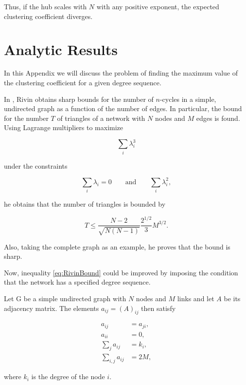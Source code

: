\documentclass{article}
\begin{document}
Thus, if the hub scales with $N$ with any positive exponent, the expected clustering coefficient diverges.

\section{Analytic Results}

In this Appendix we will discuss the problem of finding the maximum value of the clustering coefficient for a given degree sequence.

In \cite{Rivin2002}, Rivin obtains sharp bounds for the number of $n$-cycles in a simple, undirected graph as a function of the number of edges. In particular, the bound for the number $T$ of triangles of a network with $N$ nodes and $M$ edges is found. Using Lagrange multipliers to maximize 

\begin{equation}
    \sum_i \lambda_i^3
\end{equation}

under the constraints

\begin{equation}
    \sum_i \lambda_i = 0\qquad \text{and} \qquad \sum_i \lambda_i^2,
\end{equation}

he obtains that the number of triangles is bounded by

\begin{equation} \label{eq:RivinBound}
    T \leq \dfrac{N-2}{\sqrt{N (N-1)}} \dfrac{2^{1/2}}{3} M^{3/2}.
\end{equation}

Also, taking the complete graph as an example, he proves that the bound is sharp.

Now, inequality \ref{eq:RivinBound} could be improved by imposing the condition that the network has a specified degree sequence.

Let G be a simple undirected graph with $N$ nodes and $M$ links and let $A$ be its adjacency matrix. The elements $a_{ij}=(A)_{ij}$ then satisfy

\begin{align}
    a_{ij} &= a_{ji}, \\
    a_{ii} &= 0, \\
    \sum_{j} a_{ij} &= k_i, \\
    \sum_{i, j} a_{ij} &= 2M,
\end{align}

where $k_i$ is the degree of the node $i$.
\\
\end{document}
